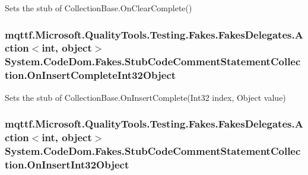 Sets the stub of Collection\-Base.\-On\-Clear\-Complete()

\hypertarget{class_system_1_1_code_dom_1_1_fakes_1_1_stub_code_comment_statement_collection_a1d248ed916ae3c206ae853dc22b77718}{
\subsubsection[{On\-Insert\-Complete\-Int32\-Object}]{\setlength{\rightskip}{0pt plus 5cm}mqttf.\-Microsoft.\-Quality\-Tools.\-Testing.\-Fakes.\-Fakes\-Delegates.\-Action$<$int, object$>$ System.\-Code\-Dom.\-Fakes.\-Stub\-Code\-Comment\-Statement\-Collection.\-On\-Insert\-Complete\-Int32\-Object}}\label{class_system_1_1_code_dom_1_1_fakes_1_1_stub_code_comment_statement_collection_a1d248ed916ae3c206ae853dc22b77718}


Sets the stub of Collection\-Base.\-On\-Insert\-Complete(\-Int32 index, Object value)

\hypertarget{class_system_1_1_code_dom_1_1_fakes_1_1_stub_code_comment_statement_collection_aaeb60cea9225d29a25d146390138d70a}{
\subsubsection[{On\-Insert\-Int32\-Object}]{\setlength{\rightskip}{0pt plus 5cm}mqttf.\-Microsoft.\-Quality\-Tools.\-Testing.\-Fakes.\-Fakes\-Delegates.\-Action$<$int, object$>$ System.\-Code\-Dom.\-Fakes.\-Stub\-Code\-Comment\-Statement\-Collection.\-On\-Insert\-Int32\-Object}}\label{class_system_1_1_code_dom_1_1_fakes_1_1_stub_code_comment_statement_collection_aaeb60cea9225d29a25d146390138d70a}


